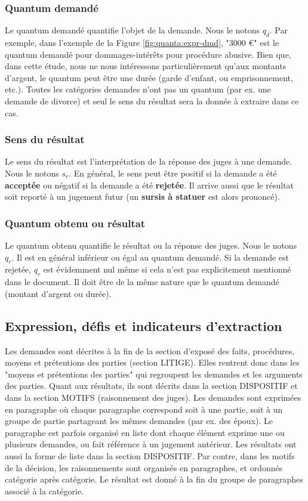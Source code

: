 \subsubsection{Quantum demandé}

Le quantum demandé quantifie l'objet de la demande. Nous le notons $q_d$. Par exemple, dans l'exemple de la Figure \ref{fig:quanta:expr-dmd}, "3000 \euro{}" est le quantum demandé pour dommages-intérêts pour procédure abusive. Bien que, dans cette étude, nous ne nous intéressons particulièrement qu'aux montants d'argent, le quantum peut être une durée (garde d'enfant, ou emprisonnement, etc.). Toutes les catégories demandes n'ont pas un quantum (par ex. une demande de divorce) et seul le sens du résultat sera la donnée à extraire dans ce cas.

\subsubsection{Sens du résultat}

Le sens du résultat est l'interprétation de la réponse des juges à une demande. Nous le notons $s_r$. En général, le sens peut être positif si la demande a été \textbf{acceptée} ou négatif si la demande a été \textbf{rejetée}. Il arrive aussi que le résultat soit reporté à un jugement futur (un \textbf{sursis à statuer} est alors prononcé). 

\subsubsection{Quantum obtenu ou résultat}

Le quantum obtenu quantifie le résultat ou la réponse des juges. Nous le notons $q_r$. Il est en général inférieur ou égal au quantum demandé. Si la demande est rejetée, 
$q_r$ est évidemment nul même si cela n'est pas explicitement mentionné dans le document. Il doit être de la même nature que le quantum demandé (montant d'argent ou durée).


\subsection{Expression, défis et indicateurs d'extraction}

Les demandes sont décrites à la fin de la section d'exposé des faits, procédures, moyens et prétentions des parties (section LITIGE). Elles rentrent donc dans les "moyens et prétentions des parties" qui regroupent les demandes et les arguments des parties. Quant aux résultats, ils sont décrits dans la section DISPOSITIF et dans la section MOTIFS (raisonnement des juges). Les demandes sont exprimées en paragraphe où chaque paragraphe correspond soit à une partie, soit à un groupe de partie partageant les mêmes demandes (par ex. des époux). Le paragraphe est parfois organisé en liste dont chaque élément exprime une ou plusieurs demandes, ou fait référence à un jugement antérieur. Les résultats ont aussi la forme de liste dans la section DISPOSITIF. Par contre, dans les motifs de la décision, les raisonnements sont organisés en paragraphes, et ordonnés catégorie après catégorie. Le résultat est donné à la fin du groupe de paragraphes associé à la catégorie.


